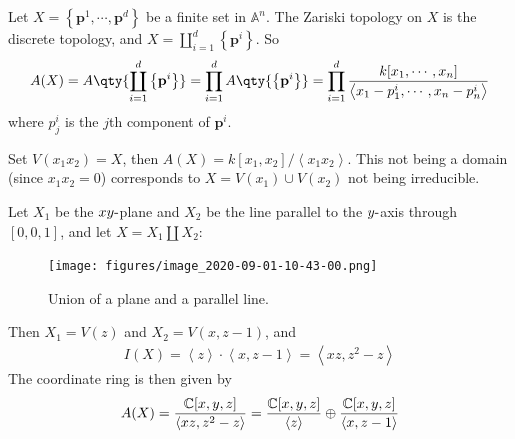 \begin{example}

Let \(X = \left\{{\mathbf{p}^1, \cdots, \mathbf{p}^d}\right\}\) be a
finite set in \({\mathbb{A}}^n\). The Zariski topology on \(X\) is the
discrete topology, and
\(X = {\coprod}_{i=1}^d \left\{{\mathbf{p}^i}\right\}\). So
\begin{align*}  
A(X) = A\qty{\displaystyle\coprod_{i=1}^d \left\{{\mathbf{p}^i}\right\}} = \prod_{i=1}^d A\qty{\left\{{\mathbf{p}^i}\right\}} = \prod_{i=1}^d \frac{ k[x_1, \cdots, x_n]} {\left\langle{x_1 - p^i_1, \cdots, x_n - p^i_n}\right\rangle }
\end{align*}
where \(p_j^i\) is the \(j\)th component of \(\mathbf{p}^i\).

\end{example}

\begin{example}

Set \(V(x_1 x_2) = X\), then
\(A(X) = k[x_1, x_2]/ \left\langle{x_1 x_2}\right\rangle\). This not
being a domain (since \(x_1 x_2 = 0\)) corresponds to
\(X = V(x_1) \cup V(x_2)\) not being irreducible.

\end{example}

\begin{example}

Let \(X_1\) be the \(xy{\hbox{-}}\)plane and \(X_2\) be the line
parallel to the \(y{\hbox{-}}\)axis through
\({\left[ {0,0,1} \right]}\), and let \(X= X_1 {\coprod}X_2\):

\begin{figure}
\centering
\texttt{[image: figures/image\_2020-09-01-10-43-00.png]}
\caption{Union of a plane and a parallel line.}
\end{figure}

Then \(X_1 = V(z)\) and \(X_2 = V(x, z-1)\), and
\begin{align*}
I(X) = \left\langle{z}\right\rangle \cdot \left\langle{x, z-1}\right\rangle=  \left\langle{xz, z^2 - z}\right\rangle
\end{align*}
The coordinate ring is then given by
\begin{align*}
A(X) = { {\mathbb{C}}[x, y, z] \over \left\langle{xz, z^2 - z}\right\rangle } = { {\mathbb{C}}[x, y, z] \over  \left\langle{z}\right\rangle } \oplus { {\mathbb{C}}[x, y,z] \over \left\langle{x, z-1}\right\rangle }
\end{align*}

\end{example}

